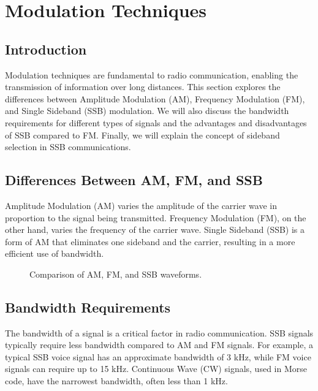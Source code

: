 \section{Modulation Techniques}
\label{section:modulation_techniques}

\subsection*{Introduction}
Modulation techniques are fundamental to radio communication, enabling the transmission of information over long distances. This section explores the differences between Amplitude Modulation (AM), Frequency Modulation (FM), and Single Sideband (SSB) modulation. We will also discuss the bandwidth requirements for different types of signals and the advantages and disadvantages of SSB compared to FM. Finally, we will explain the concept of sideband selection in SSB communications.

\subsection*{Differences Between AM, FM, and SSB}
Amplitude Modulation (AM) varies the amplitude of the carrier wave in proportion to the signal being transmitted. Frequency Modulation (FM), on the other hand, varies the frequency of the carrier wave. Single Sideband (SSB) is a form of AM that eliminates one sideband and the carrier, resulting in a more efficient use of bandwidth.

\begin{figure}[h!]
    \centering
    \caption{Comparison of AM, FM, and SSB waveforms.}
    \label{fig:waveform_comparison}
\end{figure}

\subsection*{Bandwidth Requirements}
The bandwidth of a signal is a critical factor in radio communication. SSB signals typically require less bandwidth compared to AM and FM signals. For example, a typical SSB voice signal has an approximate bandwidth of 3 kHz, while FM voice signals can require up to 15 kHz. Continuous Wave (CW) signals, used in Morse code, have the narrowest bandwidth, often less than 1 kHz.

